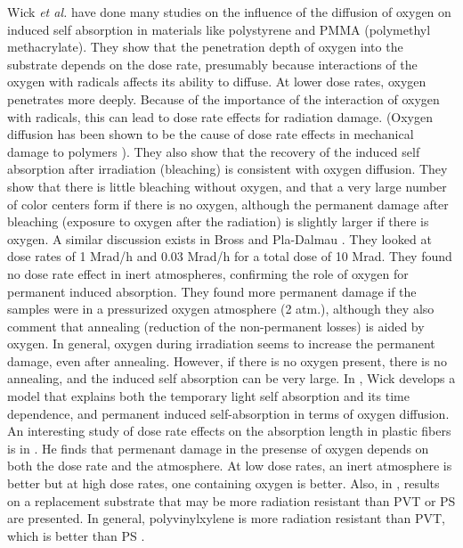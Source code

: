 Wick {\it{et al.}} \cite{Wick1991472}
have done many studies on the influence of the diffusion of oxygen on
induced self absorption
in materials like polystyrene and PMMA
(polymethyl methacrylate).  
They show that the penetration depth of oxygen into the substrate
depends on the dose rate, presumably because interactions
of the oxygen with radicals affects its ability to diffuse.  
At lower dose rates, oxygen penetrates
more deeply.  Because of the importance of the interaction
of oxygen with radicals, this can lead to dose rate effects
for radiation damage.  (Oxygen diffusion has been shown to 
be the cause of dose rate effects in mechanical damage to polymers
\cite{clough}).
They also show that the recovery of the
induced self absorption after irradiation (bleaching)
is consistent with
oxygen diffusion.  They show that there is little bleaching
without oxygen, and that a very large number of color centers
form if there is no oxygen, although the permanent damage after
bleaching (exposure to oxygen after the radiation) is slightly
larger if there is oxygen.
A similar discussion exists in Bross and Pla-Dalmau \cite{173178}.
They looked at dose rates of 1 Mrad/h and 0.03 Mrad/h for a
total dose of 10 Mrad.  They found no dose rate effect in
inert atmospheres, confirming the role of oxygen for permanent
induced absorption.  They found more permanent damage if the samples
were in a pressurized oxygen atmosphere (2 atm.), although
they also comment that annealing (reduction of the non-permanent losses)
is aided by oxygen.
In general, oxygen during irradiation seems to increase the permanent
damage, even after annealing.  However, if there is no oxygen present,
there is no annealing, and the induced self absorption can be very large.
In \cite{Wulkop1995141}, Wick develops a model that explains
both the temporary light self absorption
and its time dependence, and permanent induced self-absorption in
terms of oxygen diffusion.
An interesting study of dose rate effects on the absorption length
in plastic fibers is in \cite{zorn2}.  
He finds that permenant damage in the presense of oxygen depends
on both the dose rate and the atmosphere.  At low dose rates,
an inert atmosphere is better but at high dose rates, one containing 
oxygen is better.
Also, in \cite{zorn3}, results on a replacement substrate
that may be more radiation resistant than PVT or PS are presented.
In general, polyvinylxylene is more radiation resistant than PVT, which
is better than PS \cite{sauli}.


